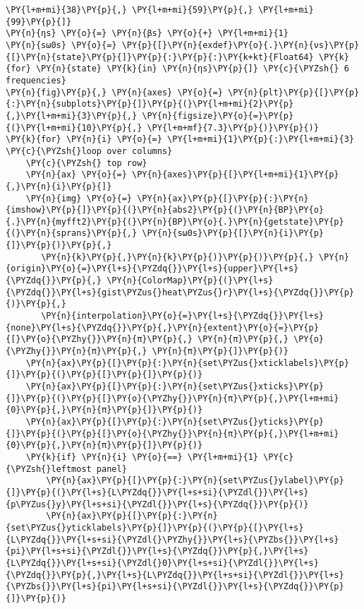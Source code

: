 \begin{Verbatim}[commandchars=\\\{\}]
      \PY{l+m+mi}{38}\PY{p}{,} \PY{l+m+mi}{59}\PY{p}{,} \PY{l+m+mi}{99}\PY{p}{]}
\PY{n}{ηs} \PY{o}{=} \PY{n}{βs} \PY{o}{+} \PY{l+m+mi}{1}
\PY{n}{sω0s} \PY{o}{=} \PY{p}{[}\PY{n}{exdef}\PY{o}{.}\PY{n}{νs}\PY{p}{[}\PY{n}{state}\PY{p}{]}\PY{p}{:}\PY{p}{:}\PY{k+kt}{Float64} \PY{k}{for} \PY{n}{state} \PY{k}{in} \PY{n}{ηs}\PY{p}{]} \PY{c}{\PYZsh{} 6 frequencies}
\PY{n}{fig}\PY{p}{,} \PY{n}{axes} \PY{o}{=} \PY{n}{plt}\PY{p}{[}\PY{p}{:}\PY{n}{subplots}\PY{p}{]}\PY{p}{(}\PY{l+m+mi}{2}\PY{p}{,}\PY{l+m+mi}{3}\PY{p}{,} \PY{n}{figsize}\PY{o}{=}\PY{p}{(}\PY{l+m+mi}{10}\PY{p}{,} \PY{l+m+mf}{7.3}\PY{p}{)}\PY{p}{)}
\PY{k}{for} \PY{n}{i} \PY{o}{=} \PY{l+m+mi}{1}\PY{p}{:}\PY{l+m+mi}{3} \PY{c}{\PYZsh{}loop over columns}
    \PY{c}{\PYZsh{} top row}
    \PY{n}{ax} \PY{o}{=} \PY{n}{axes}\PY{p}{[}\PY{l+m+mi}{1}\PY{p}{,}\PY{n}{i}\PY{p}{]}
    \PY{n}{img} \PY{o}{=} \PY{n}{ax}\PY{p}{[}\PY{p}{:}\PY{n}{imshow}\PY{p}{]}\PY{p}{(}\PY{n}{abs2}\PY{p}{(}\PY{n}{BP}\PY{o}{.}\PY{n}{myfft2}\PY{p}{(}\PY{n}{BP}\PY{o}{.}\PY{n}{getstate}\PY{p}{(}\PY{n}{sprans}\PY{p}{,} \PY{n}{sω0s}\PY{p}{[}\PY{n}{i}\PY{p}{]}\PY{p}{)}\PY{p}{,}
       \PY{n}{k}\PY{p}{,}\PY{n}{k}\PY{p}{)}\PY{p}{)}\PY{p}{,} \PY{n}{origin}\PY{o}{=}\PY{l+s}{\PYZdq{}}\PY{l+s}{upper}\PY{l+s}{\PYZdq{}}\PY{p}{,} \PY{n}{ColorMap}\PY{p}{(}\PY{l+s}{\PYZdq{}}\PY{l+s}{gist\PYZus{}heat\PYZus{}r}\PY{l+s}{\PYZdq{}}\PY{p}{)}\PY{p}{,}
       \PY{n}{interpolation}\PY{o}{=}\PY{l+s}{\PYZdq{}}\PY{l+s}{none}\PY{l+s}{\PYZdq{}}\PY{p}{,}\PY{n}{extent}\PY{o}{=}\PY{p}{[}\PY{o}{\PYZhy{}}\PY{n}{π}\PY{p}{,} \PY{n}{π}\PY{p}{,} \PY{o}{\PYZhy{}}\PY{n}{π}\PY{p}{,} \PY{n}{π}\PY{p}{]}\PY{p}{)}
    \PY{n}{ax}\PY{p}{[}\PY{p}{:}\PY{n}{set\PYZus{}xticklabels}\PY{p}{]}\PY{p}{(}\PY{p}{[}\PY{p}{]}\PY{p}{)}
    \PY{n}{ax}\PY{p}{[}\PY{p}{:}\PY{n}{set\PYZus{}xticks}\PY{p}{]}\PY{p}{(}\PY{p}{[}\PY{o}{\PYZhy{}}\PY{n}{π}\PY{p}{,}\PY{l+m+mi}{0}\PY{p}{,}\PY{n}{π}\PY{p}{]}\PY{p}{)}
    \PY{n}{ax}\PY{p}{[}\PY{p}{:}\PY{n}{set\PYZus{}yticks}\PY{p}{]}\PY{p}{(}\PY{p}{[}\PY{o}{\PYZhy{}}\PY{n}{π}\PY{p}{,}\PY{l+m+mi}{0}\PY{p}{,}\PY{n}{π}\PY{p}{]}\PY{p}{)}
    \PY{k}{if} \PY{n}{i} \PY{o}{==} \PY{l+m+mi}{1} \PY{c}{\PYZsh{}leftmost panel}
        \PY{n}{ax}\PY{p}{[}\PY{p}{:}\PY{n}{set\PYZus{}ylabel}\PY{p}{]}\PY{p}{(}\PY{l+s}{L\PYZdq{}}\PY{l+s+si}{\PYZdl{}}\PY{l+s}{p\PYZus{}y}\PY{l+s+si}{\PYZdl{}}\PY{l+s}{\PYZdq{}}\PY{p}{)}
        \PY{n}{ax}\PY{p}{[}\PY{p}{:}\PY{n}{set\PYZus{}yticklabels}\PY{p}{]}\PY{p}{(}\PY{p}{[}\PY{l+s}{L\PYZdq{}}\PY{l+s+si}{\PYZdl{}\PYZhy{}}\PY{l+s}{\PYZbs{}}\PY{l+s}{pi}\PY{l+s+si}{\PYZdl{}}\PY{l+s}{\PYZdq{}}\PY{p}{,}\PY{l+s}{L\PYZdq{}}\PY{l+s+si}{\PYZdl{}0}\PY{l+s+si}{\PYZdl{}}\PY{l+s}{\PYZdq{}}\PY{p}{,}\PY{l+s}{L\PYZdq{}}\PY{l+s+si}{\PYZdl{}}\PY{l+s}{\PYZbs{}}\PY{l+s}{pi}\PY{l+s+si}{\PYZdl{}}\PY{l+s}{\PYZdq{}}\PY{p}{]}\PY{p}{)}

\end{Verbatim}
